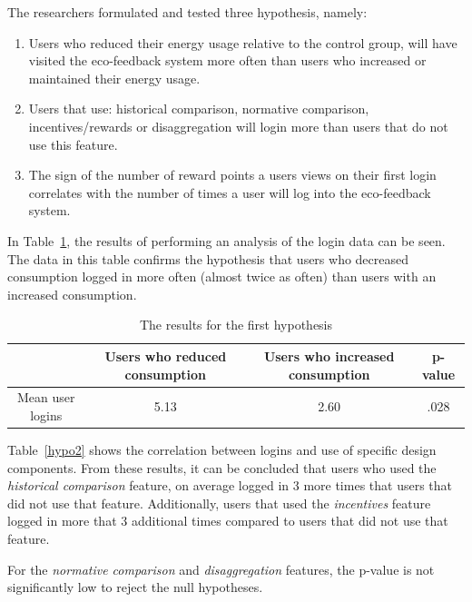 \documentclass[journal]{vgtc}                %
\begin{document}
The researchers formulated and tested three hypothesis, namely:
\begin{enumerate}
\item Users who reduced their energy usage relative to the control group, will have visited the eco-feedback system more often than users who increased or maintained their energy usage.
\item Users that use: historical comparison, normative comparison, incentives/rewards or disaggregation will login more than users that do not use this feature.
\item The sign of the number of reward points a users views on their first login correlates with the number of times a user will log into the eco-feedback system.
\end{enumerate}

In Table~\ref{hypo1}, the results of performing an analysis of the login data can be seen. The data in this table confirms the hypothesis that users who decreased consumption logged in more often (almost twice as often) than users with an increased consumption. \\

\begin{table}
  \caption{The results for the first hypothesis}
  \label{hypo1}
  \scriptsize
  \begin{center}
    \begin{tabular}{cccc}
    \multicolumn{1}{p{1cm}}{\centering } &
       \multicolumn{1}{p{2.5cm}}{\centering Users who reduced consumption} &
       \multicolumn{1}{p{2.5cm}}{\centering Users who increased consumption} &
       \multicolumn{1}{p{1cm}}{\centering p-value} \\
    \hline
      Mean user logins &  5.13 & 2.60 & .028\\

    \end{tabular}
  \end{center}
\end{table}

Table~\ref{hypo2} shows the correlation between logins and use of specific design components. From these results, it can be concluded that users who used the \textit{historical comparison} feature, on average logged in 3 more times that users that did not use that feature. Additionally, users that used the \textit{incentives} feature logged in more that 3 additional times compared to users that did not use that feature.

For the \textit{normative comparison} and \textit{disaggregation} features, the p-value is not significantly low to reject the null hypotheses. \\
\end{document}
